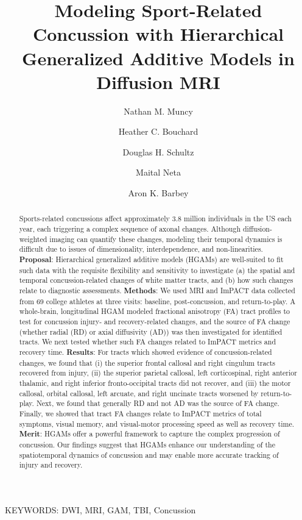 \documentclass[12pt]{article}
\title{Modeling Sport-Related Concussion with Hierarchical Generalized Additive Models in Diffusion MRI} %
\date{}
\author[1,2,*]{Nathan M. Muncy}
\author[1,2]{Heather C. Bouchard}
\author[1,2]{Douglas H. Schultz}
\author[1,2]{Maital Neta}
\author[1,2]{Aron K. Barbey}
\affil[1]{Center for Brain, Behavior and Biology, University of Nebraska-Lincoln}
\affil[2]{Department of Psychology, University of Nebraska-Lincoln}
\affil[*]{Correspondence: nmuncy2@unl.edu}
\begin{document}
\maketitle
\pagebreak


\begin{abstract} %
Sports-related concussions affect approximately 3.8 million individuals in the US each year, each triggering a complex sequence of axonal changes. Although diffusion-weighted imaging can quantify these changes, modeling their temporal dynamics is difficult due to issues of dimensionality, interdependence, and non-linearities. \textbf{Proposal}: Hierarchical generalized additive models (HGAMs) are well-suited to fit such data with the requisite flexibility and sensitivity to investigate (a) the spatial and temporal concussion-related changes of white matter tracts, and (b) how such changes relate to diagnostic assessments. \textbf{Methods}: We used MRI and ImPACT data collected from 69 college athletes at three visits: baseline, post-concussion, and return-to-play. A whole-brain, longitudinal HGAM modeled fractional anisotropy (FA) tract profiles to test for concussion injury- and recovery-related changes, and the source of FA change (whether radial (RD) or axial diffusivity (AD)) was then investigated for identified tracts. We next tested whether such FA changes related to ImPACT metrics and recovery time. \textbf{Results}: For tracts which showed evidence of concussion-related changes, we found that (i) the superior frontal callosal and right cingulum tracts recovered from injury, (ii) the superior parietal callosal, left corticospinal, right anterior thalamic, and right inferior fronto-occipital tracts did not recover, and (iii) the motor callosal, orbital callosal, left arcuate, and right uncinate tracts worsened by return-to-play. Next, we found that generally RD and not AD was the source of FA change. Finally, we showed that tract FA changes relate to ImPACT metrics of total symptoms, visual memory, and visual-motor processing speed as well as recovery time. \textbf{Merit}: HGAMs offer a powerful framework to capture the complex progression of concussion. Our findings suggest that HGAMs enhance our understanding of the spatiotemporal dynamics of concussion and may enable more accurate tracking of injury and recovery.

\end{abstract}

\vfill
KEYWORDS: DWI, MRI, GAM, TBI, Concussion\\
\pagebreak
\end{document}
